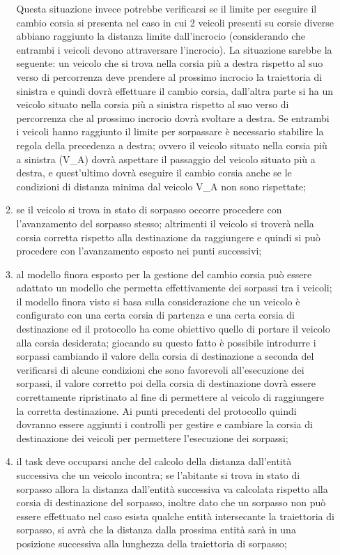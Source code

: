\begin{enumerate}
\begin{enumerate}
Questa situazione invece potrebbe verificarsi se il limite per eseguire il
cambio corsia si presenta nel caso in cui 2 veicoli presenti su corsie diverse
abbiano raggiunto la distanza limite dall'incrocio (considerando che entrambi i
veicoli devono attraversare l'incrocio). La situazione sarebbe la seguente: un
veicolo che si trova nella corsia più a destra rispetto al suo verso di
percorrenza deve prendere al prossimo incrocio la traiettoria di sinistra e
quindi dovrà effettuare il cambio corsia, dall'altra parte si ha un veicolo
situato nella corsia più a sinistra rispetto al suo verso di percorrenza che al
prossimo incrocio dovrà svoltare a destra. Se entrambi i veicoli hanno
raggiunto il limite per sorpassare è necessario stabilire la regola della
precedenza a destra; ovvero il veicolo situato nella corsia più a sinistra
(V\_A) dovrà aspettare il passaggio del veicolo situato più a destra, e
quest'ultimo dovrà eseguire il cambio corsia anche se le condizioni di distanza
minima dal veicolo V\_A non sono rispettate;
\item se il veicolo si trova in stato di sorpasso occorre procedere con l'avanzamento del sorpasso stesso; altrimenti il veicolo si troverà nella corsia corretta rispetto alla destinazione da raggiungere e quindi si può procedere con l'avanzamento esposto nei punti successivi;  
\item al modello finora esposto per la gestione del cambio corsia può essere adattato un modello che permetta effettivamente dei sorpassi tra i veicoli; il modello finora visto si basa sulla considerazione che un veicolo è configurato con una certa corsia di partenza e una certa corsia di destinazione ed il protocollo ha come obiettivo quello di portare il veicolo alla corsia desiderata; giocando su questo fatto è possibile introdurre i sorpassi cambiando il valore della corsia di destinazione a seconda del verificarsi di alcune condizioni che sono favorevoli all'esecuzione dei sorpassi, il valore corretto poi della corsia di destinazione dovrà essere correttamente ripristinato al fine di permettere al veicolo di raggiungere la corretta destinazione. Ai punti precedenti del protocollo quindi dovranno essere aggiunti i controlli per gestire e cambiare la corsia di destinazione dei veicoli per permettere l'esecuzione dei sorpassi;
\item il task deve occuparsi anche del calcolo della distanza dall'entità successiva che un veicolo incontra; se l'abitante si trova in stato di sorpasso allora la distanza dall'entità successiva va calcolata rispetto alla corsia di destinazione del sorpasso, inoltre dato che un sorpasso non può essere effettuato nel caso esista qualche entità intersecante la traiettoria di sorpasso, si avrà che la distanza dalla prossima entità sarà in una posizione successiva alla lunghezza della traiettoria di sorpasso;

\end{enumerate}
\end{enumerate}
